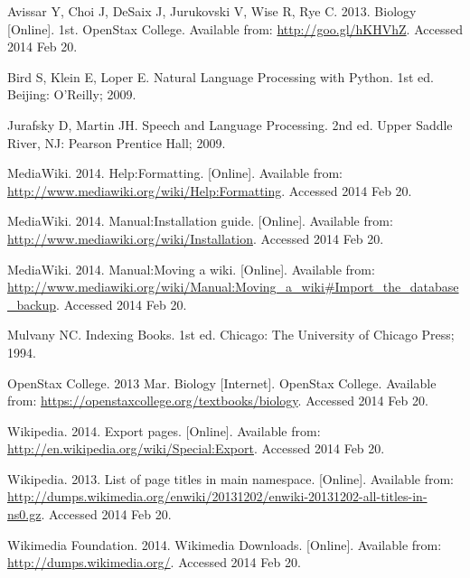 \begin{thebibliography}{99}
  Avissar Y, Choi J, DeSaix J, Jurukovski V, Wise R, Rye C. 2013. Biology [Online]. 1st. OpenStax College. Available from: \url{http://goo.gl/hKHVhZ}. Accessed 2014 Feb 20.

Bird S, Klein E, Loper E. Natural Language Processing with Python. 1st ed. Beijing: O'Reilly; 2009.

Jurafsky D, Martin JH. Speech and Language Processing. 2nd ed. Upper Saddle River, NJ: Pearson Prentice Hall; 2009.

MediaWiki. 2014. Help:Formatting. [Online]. Available from: \url{http://www.mediawiki.org/wiki/Help:Formatting}. Accessed 2014 Feb 20.

MediaWiki. 2014. Manual:Installation guide. [Online]. Available from: \url{http://www.mediawiki.org/wiki/Installation}. Accessed 2014 Feb 20.

MediaWiki. 2014. Manual:Moving a wiki. [Online]. Available from: \url{http://www.mediawiki.org/wiki/Manual:Moving_a_wiki#Import_the_database_backup}. Accessed 2014 Feb 20.

Mulvany NC. Indexing Books. 1st ed. Chicago: The University of Chicago Press; 1994.

OpenStax College. 2013 Mar. Biology [Internet]. OpenStax College. Available from: \url{https://openstaxcollege.org/textbooks/biology}. Accessed 2014 Feb 20.

Wikipedia. 2014. Export pages. [Online]. Available from: \url{http://en.wikipedia.org/wiki/Special:Export}. Accessed 2014 Feb 20.

Wikipedia. 2013. List of page titles in main namespace. [Online]. Available from: \url{http://dumps.wikimedia.org/enwiki/20131202/enwiki-20131202-all-titles-in-ns0.gz}. Accessed 2014 Feb 20.

Wikimedia Foundation. 2014. Wikimedia Downloads. [Online]. Available from: \url{http://dumps.wikimedia.org/}. Accessed 2014 Feb 20.

\end{thebibliography}